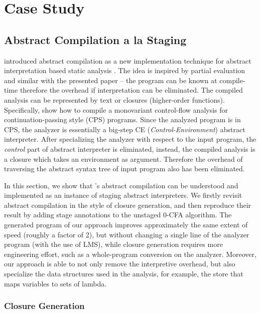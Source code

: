 \section{Case Study} \label{cases_study}

\subsection{Abstract Compilation a la Staging}

\citeauthor{Boucher:1996:ACN:647473.727587} introduced abstract compilation as a new
implementation technique for abstract interpretation based static analysis \cite{Boucher:1996:ACN:647473.727587}.
The idea is inspired by partial evaluation and similar with the presented paper -- the program can be known 
at compile-time therefore the overhead if interpretation can be eliminated. The compiled analysis
can be represented by text or closures (higher-order functions).
Specifically, \citeauthor{Boucher:1996:ACN:647473.727587} show how to compile a monovariant control-flow 
analysis \cite{Shivers:1991:SSC:115865.115884, Shivers:1988:CFA:53990.54007} 
for continuation-passing style (CPS) programs. Since the analyzed program is in CPS, the analyzer 
is essentially a big-step CE (\textit{Control-Environment}) abstract interpreter.
After specializing the analyzer with respect to the input program, the \textit{control} part of 
abstract interpreter is eliminated, instead, the compiled analysis is a closure which takes an 
environment as argument. Therefore the overhead of traversing the abstract syntax tree of input 
program also has been eliminated.

In this section, we show that \citeauthor{Boucher:1996:ACN:647473.727587}'s abstract compilation can be 
understood and implemented as an instance of staging abstract interpreters.
We firstly revisit abstract compilation in the style of closure generation,
and then reproduce their result by adding stage annotations to the unstaged 0-CFA algorithm.
The generated program of our approach improves approximately the same extent of speed (roughly a factor of 2),
but without changing a single line of the analyzer program (with the use of LMS), 
while closure generation requires more engineering effort, such as a whole-program 
conversion on the analyzer. Moreover, our approach is able to not only remove the interpretive
overhead, but also specialize the data structures used in the analysis, for example, the store
that maps variables to sets of lambda.

\subsubsection{Closure Generation}


